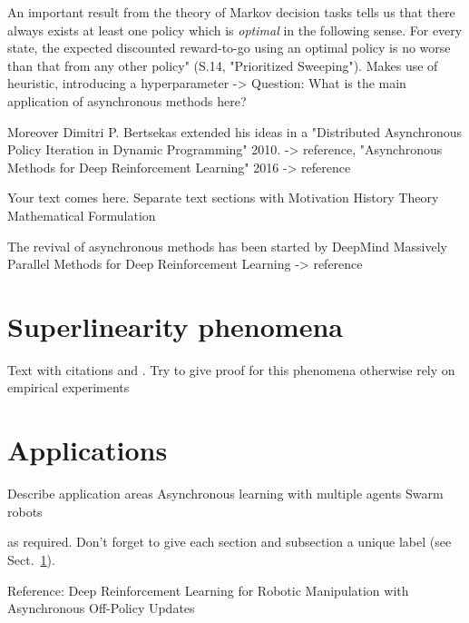     An important result from the theory of Markov decision tasks tells us that there always exists at least one policy which is \textit{optimal} in the following  sense. For every state, the expected discounted reward-to-go using an optimal policy is no worse than that from any other policy" (S.14, "Prioritized Sweeping").
    Makes use of heuristic, introducing a hyperparameter 
    -> Question: What is the main application of asynchronous methods here?
    
    
    Moreover Dimitri P. Bertsekas extended his ideas in a "Distributed Asynchronous Policy Iteration in Dynamic Programming" 2010. -> reference,
   "Asynchronous Methods for Deep Reinforcement Learning" 2016 -> reference
    
    
    
    Your text comes here. Separate text sections with
    Motivation
    History
    Theory
    Mathematical Formulation
    
    
    The revival of asynchronous methods has been started by DeepMind
    Massively Parallel Methods for Deep Reinforcement Learning -> reference
    
    \section{Superlinearity phenomena}
    \label{sec:1}
    Text with citations \cite{RefB} and \cite{RefJ}.
    Try to give proof for this phenomena otherwise rely on empirical experiments
        
    \section{Applications}
    \label{sec:2}
    Describe application areas
    Asynchronous learning with multiple agents
    Swarm robots
    
    as required. Don't forget to give each section
    and subsection a unique label (see Sect.~\ref{sec:1}).
    
    Reference: Deep Reinforcement Learning for Robotic Manipulation with
    Asynchronous Off-Policy Updates
    
